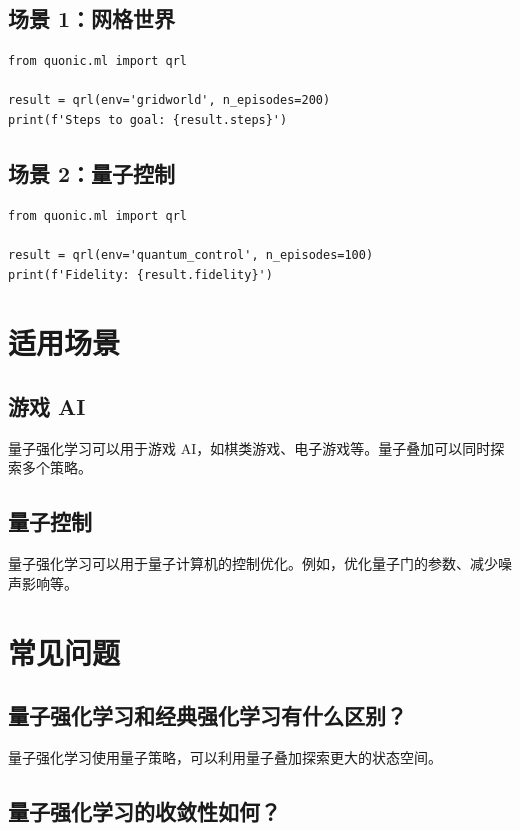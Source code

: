 \documentclass[12pt,a4paper]{article}
\begin{document}
\subsection{场景 1：网格世界}

\begin{verbatim}
from quonic.ml import qrl

result = qrl(env='gridworld', n_episodes=200)
print(f'Steps to goal: {result.steps}')
\end{verbatim}

\subsection{场景 2：量子控制}

\begin{verbatim}
from quonic.ml import qrl

result = qrl(env='quantum_control', n_episodes=100)
print(f'Fidelity: {result.fidelity}')
\end{verbatim}

\section{适用场景}

\subsection{游戏 AI}

量子强化学习可以用于游戏 AI，如棋类游戏、电子游戏等。量子叠加可以同时探索多个策略。

\subsection{量子控制}

量子强化学习可以用于量子计算机的控制优化。例如，优化量子门的参数、减少噪声影响等。

\section{常见问题}

\subsection{量子强化学习和经典强化学习有什么区别？}

量子强化学习使用量子策略，可以利用量子叠加探索更大的状态空间。

\subsection{量子强化学习的收敛性如何？}
\end{document}
